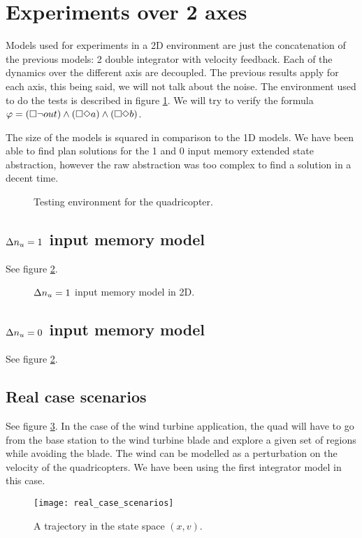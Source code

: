 \section{Experiments over 2 axes}


Models used for experiments in a 2D environment are just the concatenation of the previous models: 2 double integrator with velocity feedback.
Each of the dynamics over the different axis are decoupled.
The previous results apply for each axis, this being said, we will not talk about the noise.
The environment used to do the tests is described in figure \ref{fig:environment}. We will try to verify the formula $ \varphi = (\square \neg out) \wedge (\square \Diamond a) \wedge (\square \Diamond b)$. 

The size of the models is squared in comparison to the 1D models.
We have been able to find plan solutions for the 1 and 0 input memory extended state abstraction, however the raw abstraction was too complex to find a solution in a decent time.


\begin{figure}
	\center
	
	\caption{Testing environment for the quadricopter.}
	\label{fig:environment}
\end{figure}


\subsection{$\Delta n_u = 1$ input memory model}
See figure \ref{fig:double_reduce_2D}.

\begin{figure*}
	\center
	
	\caption{$\Delta n_u=1$ input memory model in 2D.}
	\label{fig:double_reduce_2D}
\end{figure*}

\subsection{$\Delta n_u = 0$ input memory model}
See figure \ref{fig:double_reduce_2D}.

\subsection{Real case scenarios}
See figure \ref{fig:real_case}.
In the case of the wind turbine application, the quad will have to go from the base station to the wind turbine blade and explore a given set of regions while avoiding the blade.
The wind can be modelled as a perturbation on the velocity of the quadricopters.
We have been using the first integrator model in this case.

\begin{figure}[!ht]
  \centering
  \texttt{[image: real\_case\_scenarios]}
  \caption{A trajectory in the state space $(x,v)$.}
  \label{fig:real_case}
\end{figure}

